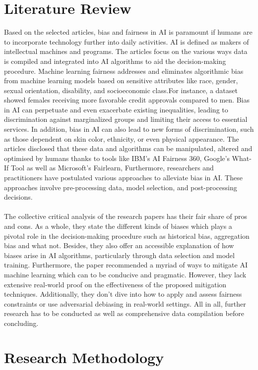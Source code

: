 \documentclass[a4paper, 12pt]{article}
\begin{document}
\section{Literature Review}
Based on the selected articles, bias and fairness in AI is paramount if humans are to incorporate technology further into daily activities. AI is defined as makers of intellectual machines and programs. The articles focus on the various ways data is compiled and integrated into AI algorithms to aid the decision-making procedure. Machine learning fairness addresses and eliminates algorithmic bias from machine learning models based on sensitive attributes like race, gender, sexual orientation, disability, and socioeconomic class.For instance, a dataset showed females receiving more favorable credit approvals compared to men. Bias in AI can perpetuate and even exacerbate existing inequalities, leading to discrimination against marginalized groups and limiting their access to essential services. In addition, bias in AI can also lead to new forms of discrimination, such as those dependent on skin color, ethnicity, or even physical appearance. The articles disclosed that these data and algorithms can be manipulated, altered and optimised by humans thanks to tools like IBM’s AI Fairness 360, Google’s What-If Tool as well as Microsoft’s Fairlearn, Furthermore, researchers and practitioners have postulated various approaches to alleviate bias in AI. These approaches involve pre-processing data, model selection, and
post-processing decisions. \\ \\

The collective critical analysis of the research papers has their fair share of pros and cons. As a whole, they state the different kinds of biases which plays a pivotal role in the decision-making procedure such as historical bias,
aggregation bias and what not. Besides, they also offer an
accessible explanation of how biases arise in AI algorithms, particularly
through data selection and model training. Furthermore, the paper recommended
a myriad of ways to mitigate AI machine learning which can to be
conducive and pragmatic. However, they lack extensive real-world proof on the effectiveness of the proposed mitigation techniques. Additionally, they don’t
dive into how to apply and assess fairness constraints or use adversarial
debiasing in real-world settings. All in all, further research has to be conducted as well as comprehensive data compilation before concluding. 

\section{Research Methodology}
\end{document}
